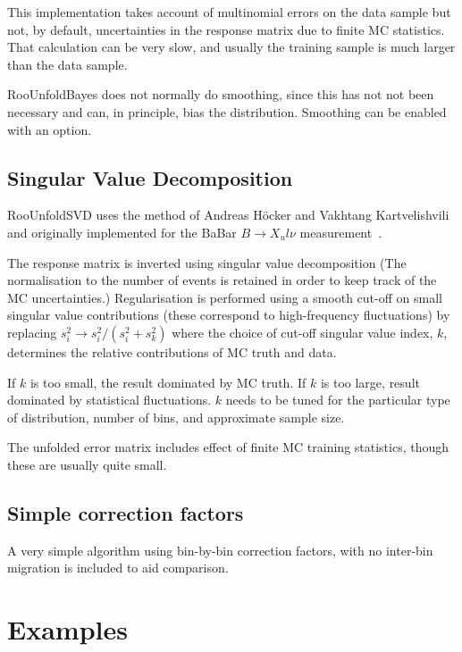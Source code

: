\documentclass{desyproc}
\begin{document}
This implementation takes account of multinomial errors on the data sample but not,
by default, uncertainties in the response matrix due to finite MC statistics.
That calculation can be very slow, and usually the training sample is much larger
than the data sample.

RooUnfoldBayes does not normally do smoothing, since this has not not been necessary
and can, in principle, bias the distribution. Smoothing can be enabled with an option.

\subsection{Singular Value Decomposition}

RooUnfoldSVD uses the method of Andreas H\"ocker and Vakhtang Kartvelishvili~\cite{Hocker:1995kb}
and originally implemented for the BaBar $B \rightarrow X_ul\nu$ measurement~\cite{Aubert:2004bq}.

The response matrix is inverted using singular value decomposition
(The normalisation to the number of events is retained in order to keep
track of the MC uncertainties.)
Regularisation is performed using a smooth cut-off on small singular value contributions
(these correspond to high-frequency fluctuations) by replacing
$s_i^2 \rightarrow s_i^2 / (s_i^2 + s_k^2)$ where the choice of cut-off singular value index, $k$,
determines the relative contributions of MC truth and data.

If $k$ is too small, the result dominated by MC truth. 
If $k$ is too large, result dominated by statistical fluctuations.
$k$ needs to be tuned for the particular type of distribution, number of bins, and approximate sample size.

The unfolded error matrix includes effect of finite MC training statistics, though these are usually quite small.

\subsection{Simple correction factors}

A very simple algorithm using bin-by-bin correction factors,
with no inter-bin migration is included to aid comparison.

\section{Examples\label{sec:adye:examples}}
\end{document}
